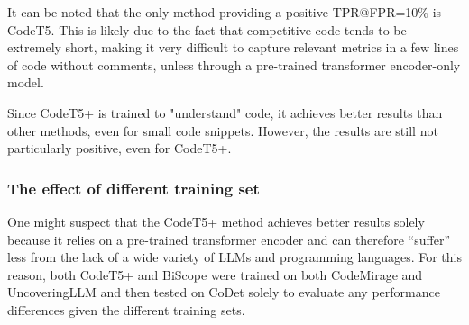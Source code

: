 It can be noted that the only method providing a positive TPR@FPR=10\% is 
CodeT5. This is likely due to the fact that competitive code tends to be 
extremely short, making it very difficult to capture relevant metrics in a 
few lines of code without comments, unless through a pre-trained transformer 
encoder-only model.

Since CodeT5+ is trained to "understand" code, it achieves better results than other methods, 
even for small code snippets. However, the results are still not particularly positive, 
even for CodeT5+.





\subsubsection{The effect of different training set}
One might suspect that the CodeT5+ method achieves better 
results solely because it relies on a pre-trained transformer 
encoder and can therefore “suffer” less from the lack of a wide 
variety of LLMs and programming languages. For this reason, both 
CodeT5+ and BiScope were trained on both CodeMirage and 
UncoveringLLM and then tested on CoDet solely to evaluate 
any performance differences given the different training sets. 


